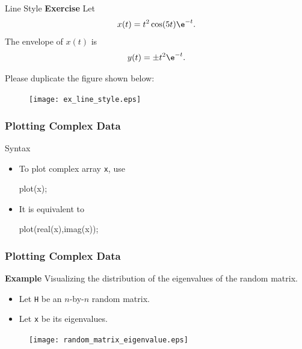 \documentclass[compress]{beamer}  %
\begin{document}
\begin{frame}{Line Style}
\textbf{Exercise}
Let
\begin{equation}
    x(t) = t^2 \cos(5t) \e^{-t}.
\end{equation}\pause
The envelope of $x(t)$ is
\begin{equation}
    y(t) = \pm t^2 \e^{-t}.
\end{equation}\pause

Please duplicate the figure shown below:
\begin{figure}[htb]
        \centering
        \texttt{[image: ex\_line\_style.eps]}
\end{figure}

\end{frame}
\begin{frame}[fragile]
\frametitle{Plotting Complex Data}

\begin{block}{Syntax}
\begin{itemize}[<+->]
    \item To plot complex array \texttt{x}, use
          \begin{matlabcodebeamer}[frame=none]
          plot(x);
          \end{matlabcodebeamer}
    \item It is equivalent to
          \begin{matlabcodebeamer}[frame=none]
          plot(real(x),imag(x));
          \end{matlabcodebeamer}
\end{itemize}
\end{block}

\end{frame}
\begin{frame}[fragile]
\frametitle{Plotting Complex Data}
\textbf{Example} 
Visualizing the distribution of the eigenvalues of the random matrix. \pause
\begin{itemize}
    \item Let \texttt{H} be an $n$-by-$n$ random matrix.
    \item Let \texttt{x} be its eigenvalues.
\end{itemize}

\pause
\begin{figure}[htb]
        \centering
        \texttt{[image: random\_matrix\_eigenvalue.eps]}
\end{figure}

\end{frame}
\end{document}
